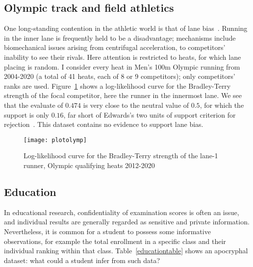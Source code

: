 \documentclass[sts]{imsart}
\begin{document}
\subsection{Olympic track and field athletics}

One long-standing contention in the athletic world is that of lane
bias~\cite{munro2022}.  Running in the inner lane is frequently held
to be a disadvantage; mechanisms include biomechanical issues arising
from centrifugal acceleration, to competitors' inability to see their
rivals.  Here attention is restricted to heats, for which lane placing
is random.  I consider every heat in Men's 100m Olympic running from
2004-2020 (a total of 41 heats, each of 8 or 9 competitors); only
competitors' ranks are used.  Figure~\ref{plotolymp} shows a
log-likelihood curve for the Bradley-Terry strength of the focal
competitor, here the runner in the innermost lane.  We see that the
evaluate of $0.474$ is very close to the neutral value of $0.5$, for
which the support is only $0.16$, far short of Edwards's two units of
support criterion for rejection~\cite{edwards1972}.  This dataset
contains no evidence to support lane bias.

\begin{figure}[t]
\texttt{[image: plotolymp]} %
\caption{Log-likelihood curve for the Bradley-Terry strength of the
  lane-1 runner, Olympic qualifying heats 2012-2020 \label{plotolymp}}
\end{figure}

\subsection{Education}

In educational research, confidentiality of examination scores is
often an issue, and individual results are generally regarded as
sensitive and private information.  Nevertheless, it is common for a
student to possess some informative observations, for example the
total enrollment in a specific class and their individual ranking
within that class.  Table~\ref{educationtable} shows an apocryphal
dataset: what could a student infer from such data?
\end{document}

